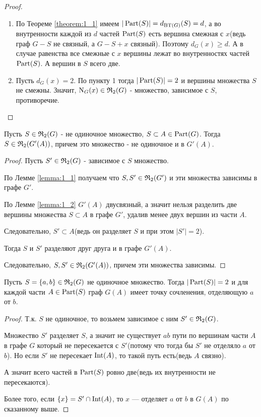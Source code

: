 \begin{proof}
	\begin{enumerate}
		\item По Теореме \ref{theorem:1_1} имеем $|\operatorname{Part}(S)| = d_{\operatorname{BT}(G)}(S) = d$, а во внутренности каждой из $d$ частей  $\operatorname{Part}(S)$ есть вершина смежная с  $x$(ведь граф $G - S$ не связный, а  $G - S + x$ связный).
			Поэтому $d_G(x) \geqslant d$.
			А в случае равенства все смежные с $x$ вершины лежат во внутренностях частей  $\operatorname{Part}(S)$.
			А вершин в  $S$ всего две.
		\item Пусть  $d_G(x) = 2$.
			По пункту 1 тогда  $|\operatorname{Part}(S)| = 2$ и вершины множества  $S$ не смежны.
			Значит, $\operatorname{N}_G(x) \in \mathfrak{R}_2(G)$ - множество, зависимое с $S$, противоречие.
	\end{enumerate}
\end{proof}

\begin{lm}[Лемма 2.2] \label{lemma:2_2}
	Пусть $S \in \mathfrak{R}_2(G)$ - не одиночное множество, $S \subset A \in \operatorname{Part}(G)$. 
	Тогда $S \in \mathfrak{R}_2(G'(A))$, причем это множество - не одиночное и в  $G'(A)$.
\end{lm}

\begin{proof}
	Пусть $S' \in \mathfrak{R}_2(G)$ - зависимое с  $S$ множество.

	По Лемме \ref{lemma:1_1} получаем что $S, S' \in \mathfrak{R}_2(G')$ и эти множества зависимы в графе $G'$.

	По Лемме \ref{lemma:1_2} $G'(A)$ двусвязный, а значит нельзя разделить две вершины множества  $S \subset A$ в графе  $G'$, удалив менее двух вершин из части  $A$.

	Следовательно,  $S' \subset A$(ведь он разделяет $S$ и при этом $|S'| = 2$).

	Тогда $S$ и  $S'$ разделяют друг друга и в графе $G'(A)$.

	Следовательно,  $S, S' \in \mathfrak{R}_2(G'(A))$, причем эти множества зависимы.

\end{proof}

\begin{lm}[Лемма 2.3] \label{lemma:2_3}
	Пусть $S = \{ a, b \} \in \mathfrak{R}_2(G)$ не одиночное множество.
	Тогда $|\operatorname{Part}(S)| = 2$ и для каждой части $A \in \operatorname{Part}(S)$ граф $G(A)$ имеет точку сочленения, отделяющую $a$ от $b$.
\end{lm}

\begin{proof}
	Т.к. $S$ не одиночное, то возьмем зависимое с ним $S' \in \mathfrak{R}_2(G)$.

	Множество $S'$ разделяет $S$, а значит не существует $ab$ пути по вершинам части $A$ в графе $G$ который не пересекается с $S'$(потому что тогда бы $S'$ не отделяло $a$ от $b$).
	Но если $S'$ не пересекает $\operatorname{Int}(A)$, то такой путь есть(ведь $A$ связно).

	А значит всего частей в $\operatorname{Part}(S)$ ровно две(ведь их внутренности не пересекаются).

	Более того, если $\{x\} = S' \cap \operatorname{Int}(A)$, то $x$ — отделяет $a$ от $b$ в $G(A)$ по сказанному выше.
	
\end{proof}

